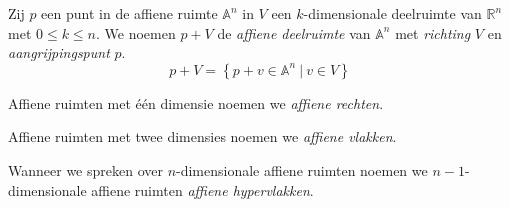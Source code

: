 \documentclass[main.tex]{subfiles}
\begin{document}
\begin{de}
  \label{de:affiene-deelruimte}
  Zij $p$ een punt in de affiene ruimte $\mathbb{A}^{n}$ in $V$ een $k$-dimensionale deelruimte van $\mathbb{R}^{n}$ met $0 \le k \le n$.
  We noemen $p + V$ de \emph{affiene deelruimte} van $\mathbb{A}^{n}$ met \emph{richting} $V$ en \emph{aangrijpingspunt} $p$.
  \[ p + V = \left\{ p + v \in \mathbb{A}^{n}\ |\ v \in V \right\} \]
\end{de}

\begin{de}
  Affiene ruimten met \'e\'en dimensie noemen we \emph{affiene rechten}.
\end{de}

\begin{de}
  Affiene ruimten met twee dimensies noemen we \emph{affiene vlakken}.
\end{de}

\begin{de}
  Wanneer we spreken over $n$-dimensionale affiene ruimten noemen we $n-1$-dimensionale affiene ruimten \emph{affiene hypervlakken}.
\end{de}
\end{document}
